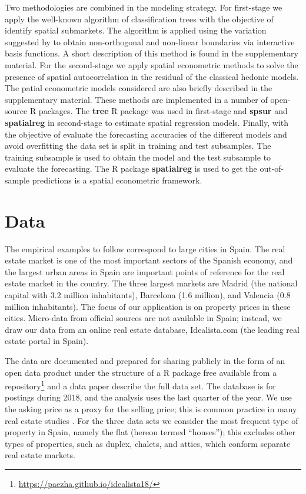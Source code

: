 \documentclass[Royal,times,sageh]{sagej}
\begin{document}
Two methodologies are combined in the modeling strategy. For first-stage
we apply the well-known algorithm of classification trees with the
objective of identify spatial submarkets. The algorithm is applied using
the variation suggested by \citet{Paez2019inducing} to obtain
non-orthogonal and non-linear boundaries via interactive basis
functions. A short description of this method is found in the
supplementary material. For the second-stage we apply spatial
econometric methods to solve the presence of spatial autocorrelation in
the residual of the classical hedonic models. The patial econometric
models considered are also briefly described in the supplementary
material. These methods are implemented in a number of open-source R
packages. The \textbf{tree} R package \citep{tree} was used in
first-stage and \textbf{spsur} \citep{lopez2020} and \textbf{spatialreg}
\citep{bivand2013} in second-stage to estimate spatial regression
models. Finally, with the objective of evaluate the forecasting
accuracies of the different models and avoid overfitting the data set is
split in training and test subsamples. The training subsample is used to
obtain the model and the test subsample to evaluate the forecasting. The
R package \textbf{spatialreg} is used to get the out-of-sample
predictions is a spatial econometric framework.

\hypertarget{data}{%
\section{Data}\label{data}}

The empirical examples to follow correspond to large cities in Spain.
The real estate market is one of the most important sectors of the
Spanish economy, and the largest urban areas in Spain are important
points of reference for the real estate market in the country. The three
largest markets are Madrid (the national capital with 3.2 million
inhabitants), Barcelona (1.6 million), and Valencia (0.8 million
inhabitants). The focus of our application is on property prices in
these cities. Micro-data from official sources are not available in
Spain; instead, we draw our data from an online real estate database,
Idealista.com (the leading real estate portal in Spain).

The data are documented and prepared for sharing publicly in the form of
an open data product \citep{arribas2021open} under the structure of a R
package free available from a
repository\footnote{\url{https://paezha.github.io/idealista18/}} and a
data paper describe the full data set. The database is for postings
during 2018, and the analysis uses the last quarter of the year. We use
the asking price as a proxy for the selling price; this is common
practice in many real estate studies
\citep[e.g.,][]{lopez2015, chasco2018}. For the three data sets we
consider the most frequent type of property in Spain, namely the flat
(hereon termed ``houses''); this excludes other types of properties,
such as duplex, chalets, and attics, which conform separate real estate
markets.
\end{document}
